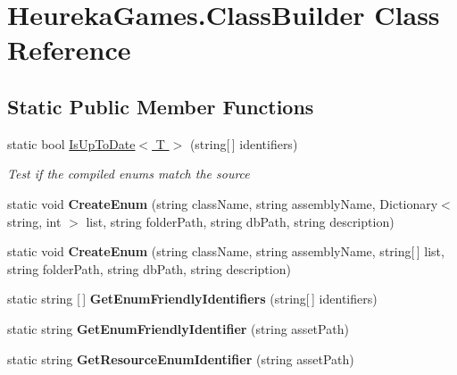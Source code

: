\hypertarget{class_heureka_games_1_1_class_builder}{}\section{Heureka\+Games.\+Class\+Builder Class Reference}
\label{class_heureka_games_1_1_class_builder}
\subsection*{Static Public Member Functions}
\begin{DoxyCompactItemize}
\item 
static bool \hyperlink{class_heureka_games_1_1_class_builder_a509f5dc56fbcd29d6b4f23f7cf77b04e}{Is\+Up\+To\+Date$<$ T $>$} (string\mbox{[}$\,$\mbox{]} identifiers)
\begin{DoxyCompactList}\small\item\em Test if the compiled enums match the source \end{DoxyCompactList}\item 
\mbox{\label{class_heureka_games_1_1_class_builder_a0ac3aada86d60b05502cda8ec211f8d4}} 
static void {\bfseries Create\+Enum} (string class\+Name, string assembly\+Name, Dictionary$<$ string, int $>$ list, string folder\+Path, string db\+Path, string description)
\item 
\mbox{\label{class_heureka_games_1_1_class_builder_a6458815205948b4362d75bed868aa735}} 
static void {\bfseries Create\+Enum} (string class\+Name, string assembly\+Name, string\mbox{[}$\,$\mbox{]} list, string folder\+Path, string db\+Path, string description)
\item 
\mbox{\label{class_heureka_games_1_1_class_builder_a14ef36cf2d2473f2c3b6294dc60bb355}} 
static string \mbox{[}$\,$\mbox{]} {\bfseries Get\+Enum\+Friendly\+Identifiers} (string\mbox{[}$\,$\mbox{]} identifiers)
\item 
\mbox{\label{class_heureka_games_1_1_class_builder_a76ecd9957d5833786703f60cb9b9fb15}} 
static string {\bfseries Get\+Enum\+Friendly\+Identifier} (string asset\+Path)
\item 
\mbox{\label{class_heureka_games_1_1_class_builder_ac37b4b768fab2f7a64f2cec28fbd8c81}} 
static string {\bfseries Get\+Resource\+Enum\+Identifier} (string asset\+Path)
\end{DoxyCompactItemize}
